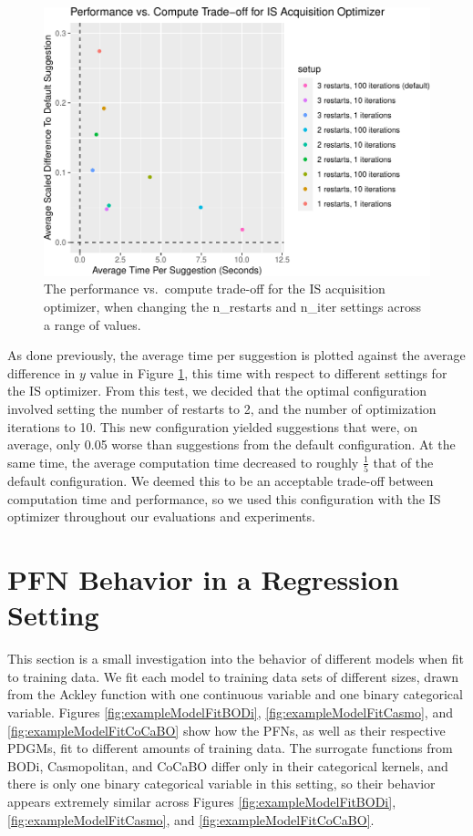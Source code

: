 \documentclass[12pt,twoside]{reedthesis}
\begin{document}
\begin{figure}
\centering
\includegraphics{thesis_files/figure-latex/is-acq-optim-test-1.pdf}
\caption{\label{fig:is-acq-optim-test}The performance vs.~compute trade-off for the IS acquisition optimizer, when changing the n\_restarts and n\_iter settings across a range of values.}
\end{figure}
As done previously, the average time per suggestion is plotted against the average difference in \(y\) value in Figure \ref{fig:is-acq-optim-test}, this time with respect to different settings for the IS optimizer. From this test, we decided that the optimal configuration involved setting the number of restarts to 2, and the number of optimization iterations to 10. This new configuration yielded suggestions that were, on average, only 0.05 worse than suggestions from the default configuration. At the same time, the average computation time decreased to roughly \(\frac{1}{5}\) that of the default configuration. We deemed this to be an acceptable trade-off between computation time and performance, so we used this configuration with the IS optimizer throughout our evaluations and experiments.

\hypertarget{modelFitExamples}{%
\chapter{PFN Behavior in a Regression Setting}\label{modelFitExamples}}

This section is a small investigation into the behavior of different models when fit to training data. We fit each model to training data sets of different sizes, drawn from the Ackley function with one continuous variable and one binary categorical variable. Figures \ref{fig:exampleModelFitBODi}, \ref{fig:exampleModelFitCasmo}, and \ref{fig:exampleModelFitCoCaBO} show how the PFNs, as well as their respective PDGMs, fit to different amounts of training data. The surrogate functions from BODi, Casmopolitan, and CoCaBO differ only in their categorical kernels, and there is only one binary categorical variable in this setting, so their behavior appears extremely similar across Figures \ref{fig:exampleModelFitBODi}, \ref{fig:exampleModelFitCasmo}, and \ref{fig:exampleModelFitCoCaBO}.
\end{document}

